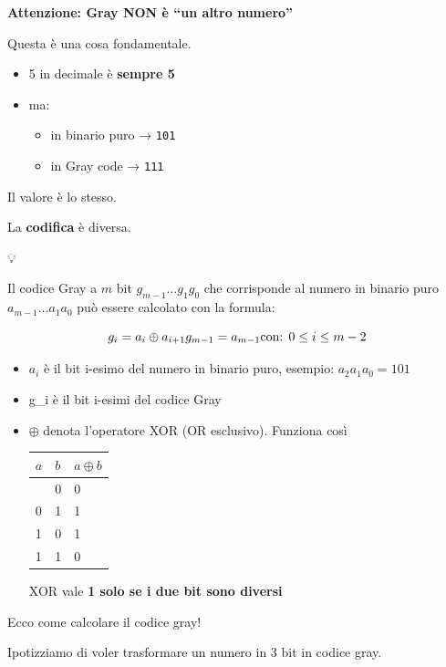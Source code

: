 \documentclass[
]{article}
\providecommand{\tightlist}{%
  \setlength{\itemsep}{0pt}\setlength{\parskip}{0pt}}
\begin{document}
\textbf{Attenzione: Gray NON è ``un altro numero''}

Questa è una cosa fondamentale.

\begin{itemize}
\tightlist
\item
  5 in decimale è \textbf{sempre 5}
\item
  ma:

  \begin{itemize}
  \tightlist
  \item
    in binario puro → \texttt{101}
  \item
    in Gray code → \texttt{111}
  \end{itemize}
\end{itemize}

Il valore è lo stesso.

La \textbf{codifica} è diversa.

💡

Il codice Gray a \(m\) bit \(g_{m-1} \dots g_1g_0\) che corrisponde al numero in binario puro \(a_{m-1} \dots a_1a_0\) può essere calcolato con la formula:

\[
g_i = a_i \oplus a_{i+1} \\ g_{m-1} = a_{m-1} \\
\text{con: } 0 \leq i \leq m - 2
\]

\begin{itemize}
\item
  \(a_i\) è il bit i-esimo del numero in binario puro, esempio:
  \(a_2 a_1 a_0 = 1 0 1\)
\item
  g\_i è il bit i-esimi del codice Gray
\item
  \(\oplus\) denota l'operatore XOR (OR esclusivo). Funziona così

  \begin{longtable}[]{@{}lll@{}}
  \toprule\noalign{}
  \(a\) & \(b\) & \(a \oplus b\) \\
  \midrule\noalign{}
  \endhead
  \bottomrule\noalign{}
  \endlastfoot
  0 & 0 & 0 \\
  0 & 1 & 1 \\
  1 & 0 & 1 \\
  1 & 1 & 0 \\
  \end{longtable}

  XOR vale \textbf{1 solo se i due bit sono diversi}
\end{itemize}

Ecco come calcolare il codice gray!

Ipotizziamo di voler trasformare un numero in 3 bit in codice gray.
\end{document}
